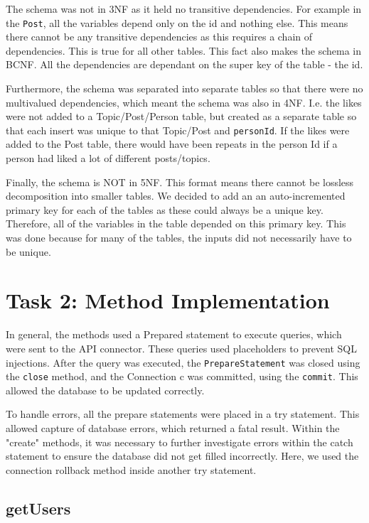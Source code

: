 \documentclass{article}
\begin{document}
The schema was not in 3NF as it held no transitive dependencies. For example in the \texttt{Post}, all the variables depend only on the id and nothing else. This means there cannot be any transitive dependencies as this requires a chain of dependencies. This is true for all other tables. This fact also makes the schema in BCNF. All the dependencies are dependant on the super key of the table - the id.

Furthermore, the schema was separated into separate tables so that there were no multivalued dependencies, which meant the schema was also in 4NF. I.e. the likes were not added to a Topic/Post/Person table, but created as a separate table so that each insert was unique to that Topic/Post and \texttt{personId}. If the likes were added to the Post table, there would have been repeats in the person Id if a person had liked a lot of different posts/topics.

Finally, the schema is NOT in 5NF. This format means there cannot be lossless decomposition into smaller tables. We decided to add an an auto-incremented primary key for each of the tables as these could always be a unique key. Therefore, all of the variables in the table depended on this primary key. This was done because for many of the tables, the inputs did not necessarily have to be unique. 

\section*{Task 2: Method Implementation}

In general, the methods used a Prepared statement to execute queries, which were sent to the API connector. These queries used placeholders to prevent SQL injections. After the query was executed, the \texttt{PrepareStatement} was closed using the \texttt{close} method, and the Connection c was committed, using the \texttt{commit}. This allowed the database to be updated correctly.

To handle errors, all the prepare statements were placed in a try statement. This allowed capture of database errors, which returned a fatal result. Within the "create" methods, it was necessary to further investigate errors within the catch statement to ensure the database did not get filled incorrectly. Here, we used the connection rollback method inside another try statement.

\subsection*{getUsers}
\end{document}
